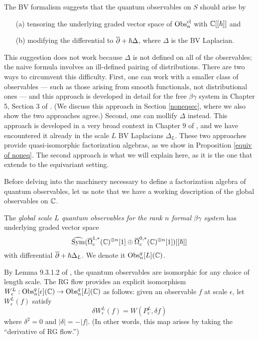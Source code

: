 The BV formalism suggests that the quantum observables on $S$ should arise by 
\begin{enumerate}
\item[(a)] tensoring the underlying graded vector space of ${\rm Obs}^{\rm cl}_n$ with $\mathbb C[[\hbar]]$ and
\item[(b)] modifying the differential to $\overline{\partial} +\hbar \Delta$, where $\Delta$ is the BV Laplacian.
\end{enumerate}
This suggestion does not work because $\Delta$ is not defined on all of the observables;
the naive formula involves an ill-defined pairing of distributions.
There are two ways to circumvent this difficulty. 
First, one can work with a smaller class of observables --- such as those arising from smooth functionals, not distributional ones --- and this approach is developed in detail for the free $\beta\gamma$ system in Chapter 5, Section 3 of \cite{CG}.
(We discuss this approach in Section \ref{noneqsec}, where we also show the two approaches agree.) 
Second, one can mollify $\Delta$ instead.
This approach is developed in a very broad context in Chapter 9 of \cite{CG},
and we have encountered it already in the scale $L$ BV Laplacians $\Delta_L$.
These two approaches provide quasi-isomorphic factorization algebras, 
as we show in Proposition \ref{equiv of noneq}. The second approach is what we will explain here, as it is the one that extends to the equivariant setting.


Before delving into the machinery necessary to define a factorization algebra of quantum observables,
let us note that we have a working description of the global observables on $\mathbb C$.

\begin{dfn}
The \emph{global scale $L$ quantum observables for the rank $n$ formal $\beta\gamma$ system} has
underlying graded vector space
\[
\widehat{{\rm Sym}}(\overline{\Omega}^{1,*}_c(\mathbb C)^{\oplus n}[1] \oplus \overline{\Omega}^{0,*}_c(\mathbb C)^{\oplus n}[1])[[\hbar]]
\]
with differential $\overline{\partial} + \hbar \Delta_L$. 
We denote it ${\rm Obs}^q_n[L](\mathbb C)$.
\end{dfn}

By Lemma 9.3.1.2 of \cite{CG}, the quantum observables are isomorphic for any choice of length scale.
The RG flow provides an explicit isomorphism $W_\epsilon^L: {\rm Obs}^q_n[\epsilon](\mathbb C) \to {\rm Obs}^q_n[L](\mathbb C)$ as follows: 
given an observable $f$ at scale $\epsilon$, let $W_\epsilon^L(f)$ satisfy
\[
\delta W_\epsilon^L(f) = W(P_\epsilon^L, \delta f)
\]
where $\delta^2=0$ and $|\delta| = - |f|$. 
(In other words, this map arises by taking the ``derivative of RG flow.'')

